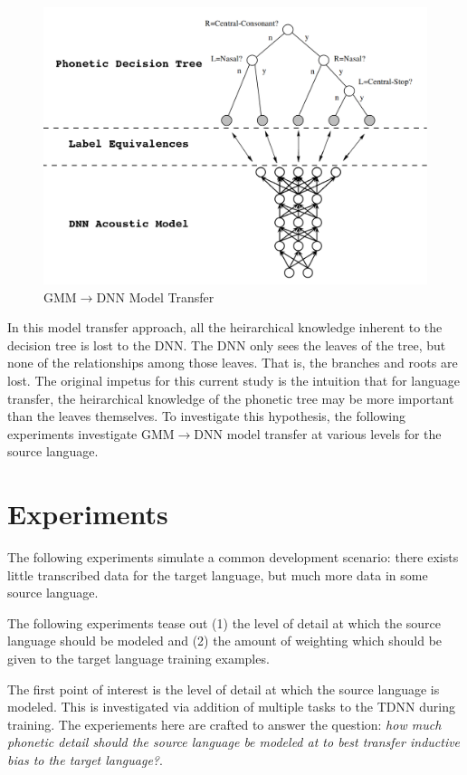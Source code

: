 \documentclass[a4paper]{article}
\begin{document}
\begin{figure}[!htbp]
  \centering
{}
  \includegraphics[width=\linewidth]{figs/tree-net.png}
  \caption{GMM$\rightarrow$DNN Model Transfer}
    \label{fig:tree-net}
  \endminipage\hfill
\end{figure}

In this model transfer approach, all the heirarchical knowledge inherent to the decision tree is lost to the DNN. The DNN only sees the leaves of the tree, but none of the relationships among those leaves. That is, the branches and roots are lost. The original impetus for this current study is the intuition that for language transfer, the heirarchical knowledge of the phonetic tree may be more important than the leaves themselves. To investigate this hypothesis, the following experiments investigate GMM$\rightarrow$DNN model transfer at various levels for the source language. 


\section{Experiments}

The following experiments simulate a common development scenario: there exists little transcribed data for the target language, but much more data in some source language.

The following experiments tease out (1) the level of detail at which the source language should be modeled and (2) the amount of weighting which should be given to the target language training examples.

The first point of interest is the level of detail at which the source language is modeled. This is investigated via addition of multiple tasks to the TDNN during training. The experiements here are crafted to answer the question: \textit{how much phonetic detail should the source language be modeled at to best transfer inductive bias to the target language?}.
\end{document}

